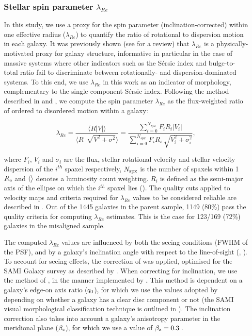 \documentclass[fleqn,usenatbib]{mnras}
\begin{document}
\subsubsection{Stellar spin parameter $\lambda_{Re}$}
In this study, we use a proxy for the  spin parameter (inclination-corrected) within one effective radius ($\lambda_{Re}$) to quantify the ratio of rotational to dispersion motion in each galaxy. It was previously shown (see \citealt{Cappellari_review} for a review) that $\lambda_{Re}$ is a physically-motivated proxy for galaxy structure, informative in particular in the case of massive systems where other indicators such as the S\'ersic index and bulge-to-total ratio fail to discriminate between rotationally- and dispersion-dominated systems.
To this end, we use $\lambda_{Re}$ in this work as an indicator of morphology, complementary to the single-component S\'ersic index.
Following the method described in \cite{Emsellem2007} and \cite{Emsellem2011}, we compute the spin parameter $\lambda_{Re}$ as the flux-weighted ratio of ordered to disordered motion within a galaxy:

\begin{equation}
    \lambda_{Re}=\frac{\langle R|V|\rangle}{\langle R\ \sqrt[]{V^2 + \sigma^2} \rangle} = \frac{\sum_{i=0}^{N_{spx}} F_iR_i|V_i|}{\sum_{i=0}^{N_{spx}} F_iR_i\ \sqrt{V_{i}^{2} + \sigma_{i}^{2}}} ,
	\label{eq:lambda_re}
\end{equation}

\noindent where $F_i$,  $V_i$ and  $\sigma_i$ are the flux, stellar rotational velocity and stellar velocity dispersion of the $i^{th}$ spaxel respectively, $N_{\rm{spx}}$ is the number of spaxels within 1 $R_{\rm{e}}$ and $\rm{\langle \rangle}$ denotes a luminosity count weighting. $R_i$ is defined as the semi-major axis of the ellipse on which the $i^{th}$ spaxel lies (\citealt{Cortese2016}). The quality cuts applied to velocity maps and criteria required for $\lambda_{Re}$ values to be considered reliable are described in \cite{vds2017}. Out of the 1445 galaxies in the parent sample, 1149 (80\%) pass the quality criteria for computing $\lambda_{Re}$ estimates. This is the case for 123/169 (72\%) galaxies in the misaligned sample.

The computed $\lambda_{Re}$ values are influenced by both the seeing conditions (FWHM of the PSF), and by a galaxy's inclination angle with respect to the line-of-sight (\citealt{Cappellari2016}, \citealt{Graham2018}). To account for seeing effects, the correction of \cite{Harborne2020} was applied, optimised for the SAMI Galaxy survey as described by \cite{jvds2021}. When correcting for inclination, we use the method of \cite{Emsellem2011}, in the manner implemented by \cite{delMoralCastro2020}. This method is dependent on a galaxy's edge-on axis ratio ($q_{\rm{0}}$), for which we use the values adopted by \cite{Cortese2016} depending on whether a galaxy has a clear disc component or not (the SAMI visual morphological classification technique is outlined in \citealt{Cortese2016}). The inclination correction also takes into account a galaxy's anisotropy parameter in the meridional plane ($\beta_{\rm{z}}$), for which we use a value of $\beta_{\rm{z}}=0.3$ \citep{Santucci2022}.
\end{document}
